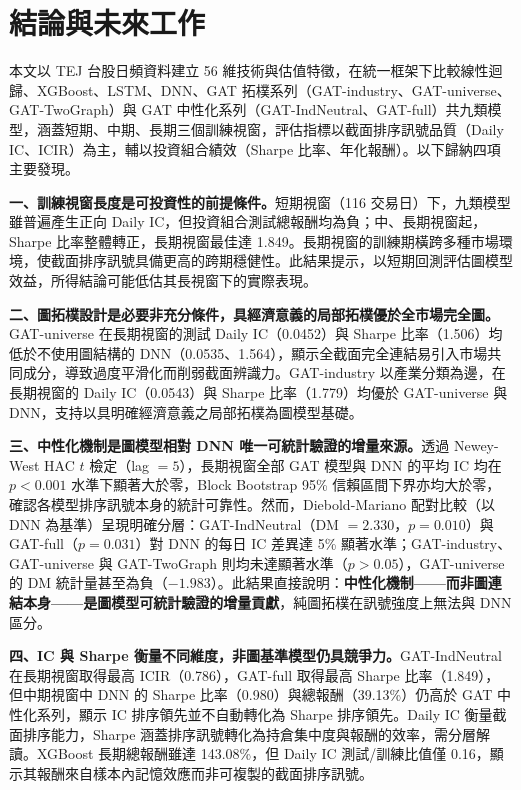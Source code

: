 \chapter{結論與未來工作}
\label{ch:conclusion}

本文以 TEJ 台股日頻資料建立 56 維技術與估值特徵，在統一框架下比較線性迴歸、XGBoost、LSTM、DNN、GAT 拓樸系列（GAT-industry、GAT-universe、GAT-TwoGraph）與 GAT 中性化系列（GAT-IndNeutral、GAT-full）共九類模型，涵蓋短期、中期、長期三個訓練視窗，評估指標以截面排序訊號品質（Daily IC、ICIR）為主，輔以投資組合績效（Sharpe 比率、年化報酬）。以下歸納四項主要發現。

\textbf{一、訓練視窗長度是可投資性的前提條件。}短期視窗（116 交易日）下，九類模型雖普遍產生正向 Daily IC，但投資組合測試總報酬均為負；中、長期視窗起，Sharpe 比率整體轉正，長期視窗最佳達 1.849。長期視窗的訓練期橫跨多種市場環境，使截面排序訊號具備更高的跨期穩健性。此結果提示，以短期回測評估圖模型效益，所得結論可能低估其長視窗下的實際表現。

\textbf{二、圖拓樸設計是必要非充分條件，具經濟意義的局部拓樸優於全市場完全圖。}GAT-universe 在長期視窗的測試 Daily IC（0.0452）與 Sharpe 比率（1.506）均低於不使用圖結構的 DNN（0.0535、1.564），顯示全截面完全連結易引入市場共同成分，導致過度平滑化而削弱截面辨識力。GAT-industry 以產業分類為邊，在長期視窗的 Daily IC（0.0543）與 Sharpe 比率（1.779）均優於 GAT-universe 與 DNN，支持以具明確經濟意義之局部拓樸為圖模型基礎。

\textbf{三、中性化機制是圖模型相對 DNN 唯一可統計驗證的增量來源。}透過 Newey-West HAC $t$ 檢定（lag $= 5$），長期視窗全部 GAT 模型與 DNN 的平均 IC 均在 $p < 0.001$ 水準下顯著大於零，Block Bootstrap 95\% 信賴區間下界亦均大於零，確認各模型排序訊號本身的統計可靠性。然而，Diebold-Mariano 配對比較（以 DNN 為基準）呈現明確分層：GAT-IndNeutral（DM $= 2.330$，$p = 0.010$）與 GAT-full（$p = 0.031$）對 DNN 的每日 IC 差異達 5\% 顯著水準；GAT-industry、GAT-universe 與 GAT-TwoGraph 則均未達顯著水準（$p > 0.05$），GAT-universe 的 DM 統計量甚至為負（$-1.983$）。此結果直接說明：\textbf{中性化機制——而非圖連結本身——是圖模型可統計驗證的增量貢獻}，純圖拓樸在訊號強度上無法與 DNN 區分。

\textbf{四、IC 與 Sharpe 衡量不同維度，非圖基準模型仍具競爭力。}GAT-IndNeutral 在長期視窗取得最高 ICIR（0.786），GAT-full 取得最高 Sharpe 比率（1.849），但中期視窗中 DNN 的 Sharpe 比率（0.980）與總報酬（39.13\%）仍高於 GAT 中性化系列，顯示 IC 排序領先並不自動轉化為 Sharpe 排序領先。Daily IC 衡量截面排序能力，Sharpe 涵蓋排序訊號轉化為持倉集中度與報酬的效率，需分層解讀。XGBoost 長期總報酬雖達 143.08\%，但 Daily IC 測試/訓練比值僅 0.16，顯示其報酬來自樣本內記憶效應而非可複製的截面排序訊號。

